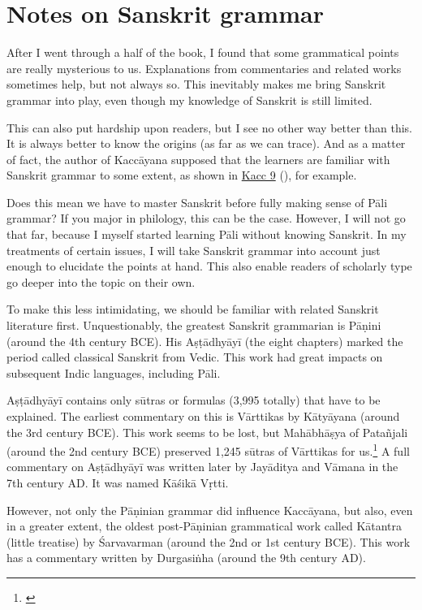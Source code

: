 \section*{Notes on Sanskrit grammar}

After I went through a half of the book, I found that some grammatical points are really mysterious to us. Explanations from commentaries and related works sometimes help, but not always so. This inevitably makes me bring Sanskrit grammar into play, even though my knowledge of Sanskrit is still limited.

This can also put hardship upon readers, but I see no other way better than this. It is always better to know the origins (as far as we can trace). And as a matter of fact, the author of Kaccāyana supposed that the learners are familiar with Sanskrit grammar to some extent, as shown in \hyperref[sut:9]{Kacc 9} (), for example.

Does this mean we have to master Sanskrit before fully making sense of Pāli grammar? If you major in philology, this can be the case. However, I will not go that far, because I myself started learning Pāli without knowing Sanskrit. In my treatments of certain issues, I will take Sanskrit grammar into account just enough to elucidate the points at hand. This also enable readers of scholarly type go deeper into the topic on their own.

To make this less intimidating, we should be familiar with related Sanskrit literature first. Unquestionably, the greatest Sanskrit grammarian is Pāṇini (around the 4th century BCE). His Aṣṭādhyāyī (the eight chapters) marked the period called classical Sanskrit from Vedic. This work had great impacts on subsequent Indic languages, including Pāli.

Aṣṭādhyāyī contains only sūtras or formulas (3,995 totally) that have to be explained. The earliest commentary on this is Vārttikas by Kātyāyana (around the 3rd century BCE). This work seems to be lost, but Mahābhāṣya of Patañjali (around the 2nd century BCE) preserved 1,245 sūtras of Vārttikas for us.\footnote{\citealp[p.~426]{keith:history}} A full commentary on Aṣṭādhyāyī was written later by Jayāditya and Vāmana in the 7th century AD. It was named Kāśikā Vṛtti.

However, not only the Pāṇinian grammar did influence Kaccāyana, but also, even in a greater extent, the oldest post-Pāṇinian grammatical work called Kātantra (little treatise) by Śarvavarman (around the 2nd or 1st century BCE). This work has a commentary written by Durgasiṅha (around the 9th century AD).

